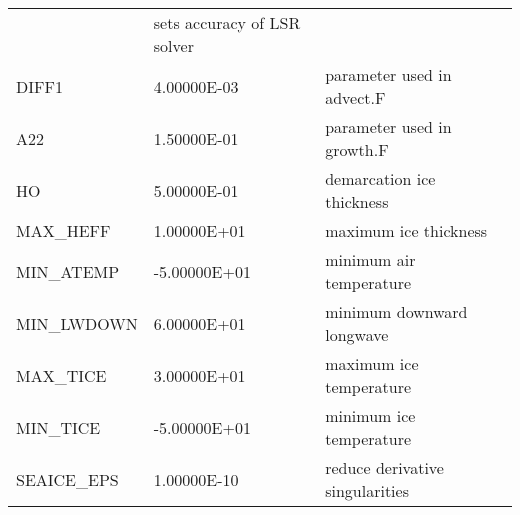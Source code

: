 \begin{table}
{\begin{tabular}{|lllc|}
    &   sets accuracy of LSR solver 
    &  %
    \\
   DIFF1               &                   4.00000E-03
    &   parameter used in advect.F 
    &  %
    \\
   A22                 &                   1.50000E-01
    &   parameter used in growth.F 
    &  %
    \\
   HO                  &                   5.00000E-01
    &   demarcation ice thickness 
    &  %
    \\
   MAX\_HEFF            &                   1.00000E+01
    &   maximum ice thickness 
    &  %
    \\
   MIN\_ATEMP           &                  -5.00000E+01
    &   minimum air temperature 
    &  %
    \\
   MIN\_LWDOWN          &                   6.00000E+01
    &   minimum downward longwave 
    &  %
    \\
   MAX\_TICE            &                   3.00000E+01
    &   maximum ice temperature 
    &  %
    \\
   MIN\_TICE            &                  -5.00000E+01
    &   minimum ice temperature 
    &  %
    \\
   SEAICE\_EPS          &                   1.00000E-10
    &   reduce derivative singularities 
    &  %
    \\
\hline
\end{tabular}
}
\end{table}

